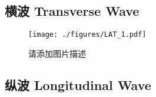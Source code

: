 
\subsection{横波 Transverse Wave}
\begin{figure}[ht]
\centering
\texttt{[image: ./figures/LAT\_1.pdf]}
\caption{请添加图片描述} \label{LAT_fig1}
\end{figure}
\subsection{纵波 Longitudinal Wave}
